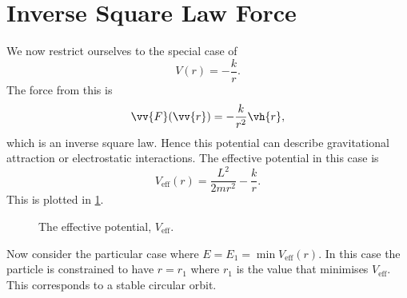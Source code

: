 \documentclass[fleqn]{NotesClass}
\newcommand*{\eff}{\mathrm{eff}}
\begin{document}
    \section{Inverse Square Law Force}
    We now restrict ourselves to the special case of
    \begin{equation}
        V(r) = -\frac{k}{r}.
    \end{equation}
    The force from this is
    \begin{equation}
        \vv{F}(\vv{r}) = -\frac{k}{r^2}\vh{r},
    \end{equation}
    which is an inverse square law.
    Hence this potential can describe gravitational attraction or electrostatic interactions.
    The effective potential in this case is
    \begin{equation}
        V_\eff(r) = \frac{L^2}{2mr^2} - \frac{k}{r}.
    \end{equation}
    This is plotted in \cref{fig:effective central potential}.
    
    \begin{figure}
        \caption{The effective potential, \(V_{\eff}\).}
        \label{fig:effective central potential}
    \end{figure}
    
    Now consider the particular case where \(E = E_1 = \min V_{\eff}(r)\).
    In this case the particle is constrained to have \(r = r_1\) where \(r_1\) is the value that minimises \(V_\eff\).
    This corresponds to a stable circular orbit.
    
\end{document}
